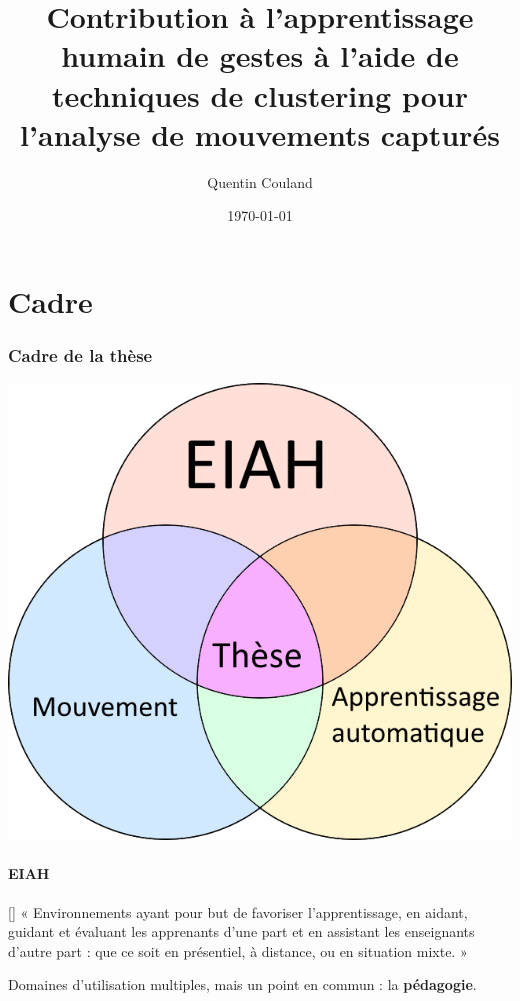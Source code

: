 \documentclass[svgnames]{beamer}
\title[]{Contribution à l'apprentissage humain de gestes à l'aide de techniques de clustering pour l’analyse de mouvements capturés}
\author{Quentin Couland}
\institute{}
\date{\today}
\newcommand{\mycite}[1]{[\textit{\cite{#1}}]}
\begin{document}
	\maketitle

	\part{Cadre}
	\section{Cadre de la thèse}
	\begin{frame}{\subsecname}
	\centering
		\includegraphics[scale=0.5]{img/venn_cadre.png}
	\end{frame}

	\subsection{EIAH}
	\begin{frame}{\subsecname}
	    \begin{block}{\mycite{Tchounikine2009PdR}}
	    « Environnements ayant pour but de favoriser l'apprentissage, en aidant, guidant et évaluant les apprenants d'une part et en assistant les enseignants d'autre part : que ce soit en présentiel, à distance, ou en situation mixte. »
	    \end{block}

	    \vspace{0.5cm}

	    Domaines d'utilisation multiples, mais un point en commun : la \textbf{pédagogie}.
	\end{frame}
\end{document}
